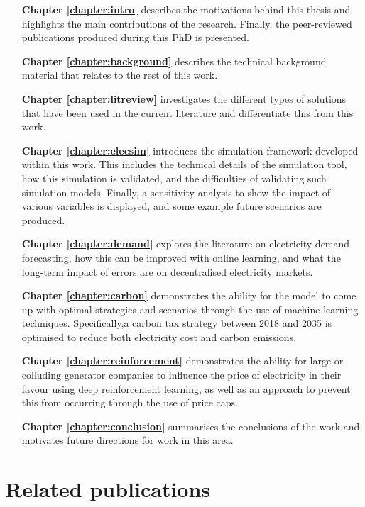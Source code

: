 \begin{itemize}[itemindent=3em]
	\item[\textbf{Chapter \ref{chapter:intro}}] describes the motivations behind this thesis and highlights the main contributions of the research. Finally, the peer-reviewed publications produced during this PhD is presented. 
	\item[\textbf{Chapter \ref{chapter:background}}] describes the technical background material that relates to the rest of this work.
	\item[\textbf{Chapter \ref{chapter:litreview}}] investigates the different types of solutions that have been used in the current literature and differentiate this from this work. 
	\item[\textbf{Chapter \ref{chapter:elecsim}}] introduces the simulation framework developed within this work. This includes the technical details of the simulation tool, how this simulation is validated, and the difficulties of validating such simulation models. Finally, a sensitivity analysis to show the impact of various variables is displayed, and some example future scenarios are produced.
	\item[\textbf{Chapter \ref{chapter:demand}}] explores the literature on electricity demand forecasting, how this can be improved with online learning, and what the long-term impact of errors are on decentralised electricity markets.
	\item[\textbf{Chapter \ref{chapter:carbon}}] demonstrates the ability for the model to come up with optimal strategies and scenarios through the use of machine learning techniques. Specifically,a carbon tax strategy between 2018 and 2035 is optimised to reduce both electricity cost and carbon emissions.
	\item[\textbf{Chapter \ref{chapter:reinforcement}}] demonstrates the ability for large or colluding generator companies to influence the price of electricity in their favour using deep reinforcement learning, as well as an approach to prevent this from occurring through the use of price caps.
	\item[\textbf{Chapter \ref{chapter:conclusion}}] summarises the conclusions of the work and motivates future directions for work in this area.
\end{itemize}




\section{Related publications}

